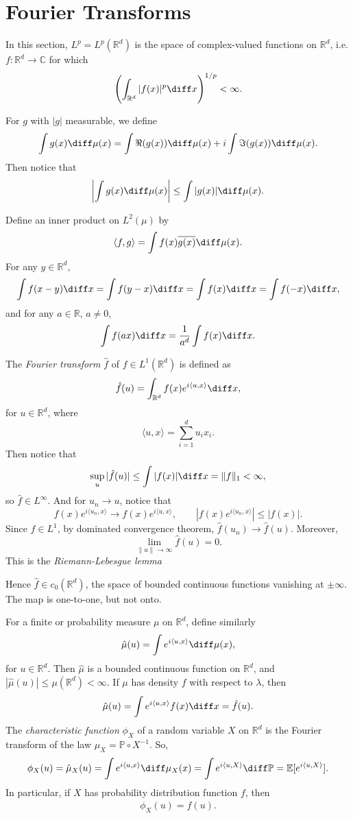 \documentclass[12pt]{article}
\begin{document}
\newpage

\section{Fourier Transforms}
\label{sec:fourier}

In this section, $L^p = L^p(\mathbb{R}^d)$ is the space of complex-valued functions on $\mathbb{R}^{d}$, i.e. $f : \mathbb{R}^{d} \to \mathbb{C}$ for which
\[
\Biggl( \int_{\mathbb{R}^{d}} |f(x)|^p \diff x \Biggr)^{1/p} < \infty.
\]

For $g$ with $|g|$ measurable, we define
\[
\int g(x) \diff \mu(x) = \int \Re(g(x)) \diff \mu(x) + i \int \Im(g(x)) \diff \mu(x).
\]
Then notice that
\[
\biggl| \int g(x) \diff \mu(x) \biggr| \leq \int |g(x)| \diff \mu(x).
\]

Define an inner product on $L^2(\mu)$ by
\[
\langle f, g \rangle = \int f(x) \overline{g(x)} \diff \mu(x).
\]
For any $y \in \mathbb{R}^{d}$,
\[
\int f(x - y) \diff x = \int f(y - x) \diff x = \int f(x) \diff x = \int f(-x) \diff x,
\]
and for any $a \in \mathbb{R}$, $a \neq 0$,
\[
\int f(ax) \diff x = \frac{1}{a^d} \int f(x) \diff x.
\]

The \emph{Fourier transform} $\hat f$ of $f \in L^1(\mathbb{R}^{d})$ is defined as
\[
\hat f(u) = \int_{\mathbb{R}^{d}} f(x) e^{i \langle u, x\rangle} \diff x,
\]
for $u \in \mathbb{R}^{d}$, where
\[
\langle u, x\rangle = \sum_{i = 1}^{d} u_i x_i.
\]
Then notice that
\[
\sup_u |\hat f(u)| \leq \int |f(x)| \diff x = \|f\|_1 < \infty,
\]
so $\hat f \in L^{\infty}$. And for $u_n \to u$, notice that
\[
f(x) e^{i \langle u_n, x\rangle} \to f(x) e^{i \langle u, x\rangle}, \qquad |f(x) e^{i \langle u_n, x\rangle}| \leq |f(x)|.
\]
Since $f \in L^1$, by dominated convergence theorem, $\hat f(u_n) \to \hat f(u)$. Moreover, 
\[
\lim_{\|u\| \to \infty} \hat f(u) = 0.
\]
This is the \emph{Riemann-Lebesgue lemma}

Hence $\hat f \in c_0(\mathbb{R}^{d})$, the space of bounded continuous functions vanishing at $\pm \infty$. The map is one-to-one, but not onto.

For a finite or probability measure $\mu$ on $\mathbb{R}^{d}$, define similarly
\[
\hat \mu(u) = \int e^{i \langle u, x \rangle} \diff \mu(x),
\]
for $u \in \mathbb{R}^{d}$. Then $\hat \mu$ is a bounded continuous function on $\mathbb{R}^{d}$, and $|\hat \mu(u)| \leq \mu(\mathbb{R}^{d}) < \infty$. If $\mu$ has density $f$ with respect to $\lambda$, then
\[
\hat \mu(u) = \int e^{i \langle u, x \rangle} f(x) \diff x = \hat f(u).
\]
The \emph{characteristic function} $\phi_X$ of a random variable $X$ on $\mathbb{R}^{d}$ is the Fourier transform of the law $\mu_X = \mathbb{P} \circ X^{-1}$. So,
\[
\phi_X(u) = \hat \mu_X(u) = \int e^{i \langle u, x\rangle} \diff \mu_X(x) = \int e^{i\langle u, X\rangle}\diff \mathbb{P} = \mathbb{E}[e^{i \langle u, X\rangle}].
\]
In particular, if $X$ has probability distribution function $f$, then
\[
\phi_X(u) = \hat f(u).
\]
\end{document}

